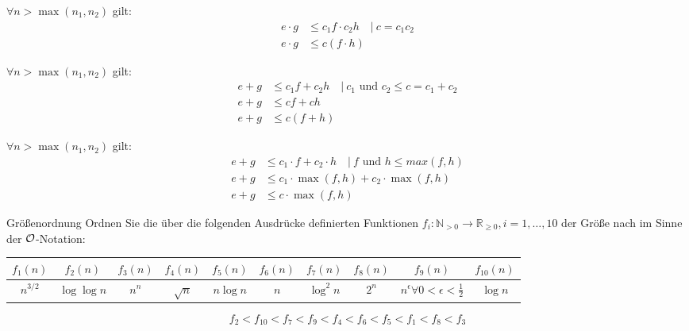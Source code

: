 \documentclass{exercisesheet}
\begin{document}
\begin{solutions}
  \item $\forall n>\max(n_1,n_2)$ gilt:
  \begin{align*}
    e \cdot g & \leq c_1 f \cdot c_2 h \quad|\ c=c_1c_2 \\
    e \cdot g & \leq c (f \cdot h)
  \end{align*}
  \item $\forall n>\max(n_1,n_2)$ gilt:
  \begin{align*}
    e + g & \leq c_1 f + c_2 h \quad|\ c_1 \text{ und } c_2 \leq c=c_1+c_2 \\
    e + g & \leq cf + ch                                                   \\
    e + g & \leq c(f + h)
  \end{align*}
  \item $\forall n>\max(n_1,n_2)$ gilt:
  \begin{align*}
    e + g & \leq c_1 \cdot f + c_2 \cdot h \quad|\ f\text{ und } h \leq max(f,h) \\
    e + g & \leq c_1 \cdot \max(f,h) + c_2 \cdot \max(f,h)                       \\
    e + g & \leq c \cdot \max(f,h)
  \end{align*}
\end{solutions}

\begin{exercise}{Größenordnung}
  Ordnen Sie die über die folgenden Ausdrücke definierten Funktionen $f_i : \mathbb{N}_{>0} \rightarrow \mathbb{R}_{\geq 0}, i = 1, \ldots, 10$ der Größe nach im Sinne der $\mathcal{O}$-Notation:
  \begin{table}
    \centering
    \begin{tabular}[ht]{c|c|c|c|c | c|c|c|c|c}
      $f_1(n)$  & $f_2(n)$      & $f_3(n)$ & $f_4(n)$   & $f_5(n)$    & $f_6(n)$ & $f_7(n)$    & $f_8(n)$ & $f_9(n)$                                     & $f_{10}(n)$ \\
      \hline
      $n^{3/2}$ & $\log\log{n}$ & $n^n$    & $\sqrt{n}$ & $n \log{n}$ & $n$      & $\log^2{n}$ & $2^n$    & $n^{\epsilon}\forall 0<\epsilon<\frac{1}{2}$ & $\log{n}$
    \end{tabular}
  \end{table}

  \begin{solution}
    \begin{equation*}
      f_2 < f_{10} < f_7 < f_9 < f_4 < f_6 < f_5 < f_1 < f_8 < f_3
    \end{equation*}
  \end{solution}
\end{exercise}
\end{document}
